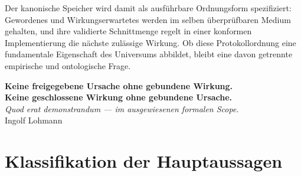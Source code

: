\documentclass[11pt,a4paper]{article}
\theoremstyle{remark}
\begin{document}
Der kanonische Speicher wird damit als ausführbare Ordnungsform spezifiziert:
Gewordenes und Wirkungserwartetes werden im selben überprüfbaren Medium
gehalten, und ihre validierte Schnittmenge regelt in einer konformen
Implementierung die nächste zulässige Wirkung. Ob diese Protokollordnung eine
fundamentale Eigenschaft des Universums abbildet, bleibt eine davon getrennte
empirische und ontologische Frage.

\begin{center}
\large
\textbf{Keine freigegebene Ursache ohne gebundene Wirkung.}\\
\textbf{Keine geschlossene Wirkung ohne gebundene Ursache.}\\[0.5em]
\textit{Quod erat demonstrandum --- im ausgewiesenen formalen Scope.}\\
Ingolf Lohmann
\end{center}

\section*{Klassifikation der Hauptaussagen}
\end{document}
